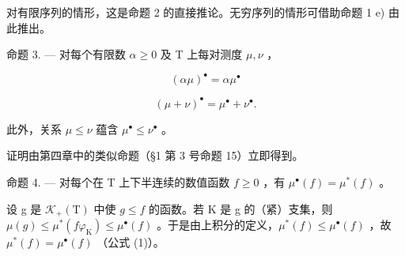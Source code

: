 对有限序列的情形，这是命题 2 的直接推论。无穷序列的情形可借助命题 1 e) 由此推出。

命题 3. --- 对每个有限数 \(\alpha \geqslant 0\) 及 T 上每对测度 \(\mu, \nu\) ，

\[
(\alpha \mu) ^ {\bullet} = \alpha \mu^ {\bullet}
\]

\[
(\mu + \nu) ^ {\bullet} = \mu^ {\bullet} + \nu^ {\bullet}.
\]

此外，关系 \(\mu \leqslant \nu\) 蕴含 \(\mu^{\bullet} \leqslant \nu^{\bullet}\) 。

证明由第四章中的类似命题（§1 第 3 号命题 15）立即得到。

命题 4. --- 对每个在 T 上下半连续的数值函数 \(f \geqslant 0\) ，有 \(\mu^{\bullet}(f) = \mu^{*}(f)\) 。

设 g 是 \(\mathcal{K}_{+}(\mathrm{T})\) 中使 \(g \leqslant f\) 的函数。若 K 是 g 的（紧）支集，则 \(\mu(g) \leqslant \mu^{*}(f\varphi_{\mathrm{K}}) \leqslant \mu^{\bullet}(f)\) 。于是由上积分的定义，\(\mu^{*}(f) \leqslant \mu^{\bullet}(f)\) ，故 \(\mu^{*}(f) = \mu^{\bullet}(f)\) （公式 (1)）。

